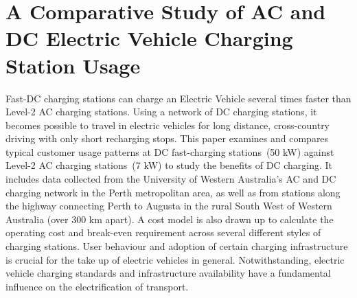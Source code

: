 
\chapter[Comparative Study of AC and DC Electric Vehicle Charging Station Usage]{A Comparative Study of AC and DC Electric Vehicle Charging Station Usage}
\label{ch:charging}

\ifpdf
	\graphicspath{{Chapter10/Figs/Raster/}{Chapter10/Figs/PDF/}{Chapter10/Figs/}}
\else
	\graphicspath{{Chapter10/Figs/Vector/}{Chapter10/Figs/}}
\fi

Fast-DC charging stations can charge an Electric Vehicle several times faster than Level-2 AC charging stations. Using a network of DC charging stations, it becomes possible to travel in electric vehicles for long distance, cross-country driving with only short recharging stops. This paper examines and compares typical customer usage patterns at DC fast-charging stations~(50 kW) against Level-2 AC charging stations~(7 kW) to study the benefits of DC charging. It includes data collected from the University of Western Australia's AC and DC charging network in the Perth metropolitan area, as well as from stations along the highway connecting Perth to Augusta in the rural South West of Western Australia (over 300 km apart). A cost model is also drawn up to calculate the operating cost and break-even requirement across several different styles of charging stations. User behaviour and adoption of certain charging infrastructure is crucial for the take up of electric vehicles in general. Notwithstanding, electric vehicle charging standards and infrastructure availability have a fundamental influence on the electrification of transport.

